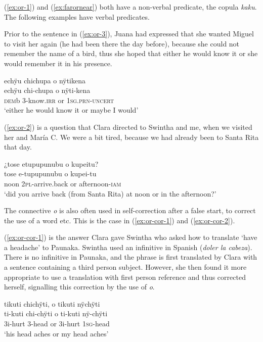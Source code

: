 (\ref{ex:or-1}) and (\ref{ex:farornear}) both have a non-verbal predicate, the copula \textit{kaku}. The following examples have verbal predicates.

Prior to the sentence in (\ref{ex:or-3}), Juana had expressed that she wanted Miguel to visit her again (he had been there the day before), because she could not remember the name of a bird, thus she hoped that either he would know it or she would remember it in his presence.

\ea\label{ex:or-3}
\begingl
\glpreamble echÿu chichupa o nÿtikena\\
\gla echÿu chi-chupa o nÿti-kena\\
\glb \textsc{dem}b 3-know.\textsc{irr} or 1\textsc{sg.prn}-\textsc{uncert}\\
\glft ‘either he would know it or maybe I would’
\endgl
\trailingcitation{[jxx-p120430l-1.094]}
\xe

(\ref{ex:or-2}) is a question that Clara directed to Swintha and me, when we visited her and María C. We were a bit tired, because we had already been to Santa Rita that day.

\ea\label{ex:or-2}
\begingl
\glpreamble ¿tose etupupunubu o kupeitu?\\
\gla tose e-tupupunubu o kupei-tu\\
\glb noon 2\textsc{pl}-arrive.back or afternoon-\textsc{iam}\\
\glft ‘did you arrive back (from Santa Rita) at noon or in the afternoon?’
\endgl
\trailingcitation{[cux-c120414ls-2.332]}
\xe

 The connective \textit{o} is also often used in self-correction after a false start, to correct the use of a word etc. This is the case in (\ref{ex:or-cor-1}) and (\ref{ex:or-cor-2}).
 
(\ref{ex:or-cor-1}) is the answer Clara gave Swintha who asked how to translate ‘have a head\-ache’ to Paunaka. Swintha used an infinitive in Spanish (\textit{doler la cabeza}). There is no infinitive in Paunaka, and the phrase is first translated by Clara with a sentence containing a third person subject. However, she then found it more appropriate to use a translation with first person reference and thus corrected herself, signalling this correction by the use of \textit{o}.

\ea\label{ex:or-cor-1}
\begingl
\glpreamble tikuti chichÿti, o tikuti nÿchÿti \\
\gla ti-kuti chi-chÿti o ti-kuti nÿ-chÿti \\
\glb 3i-hurt 3-head or 3i-hurt 1\textsc{sg}-head\\
\glft ‘his head aches or my head aches’
\endgl
\trailingcitation{[cux-c120414ls-1.007-008]}
\xe


